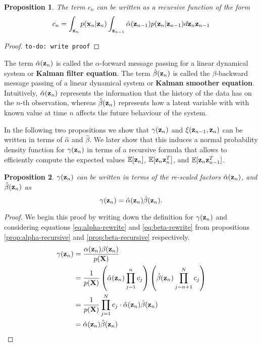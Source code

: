 \documentclass[11pt]{article}
\numberwithin{equation}{section}
\newcommand{\x}{{\bf x}}
\newcommand{\z}{{\bf z}}
\newtheorem{proposition}{Proposition}[section]
\begin{document}
\begin{proposition}
	The term $c_n$ can be written as a recursive function of the form
	\begin{equation}
		c_n = \int_{\z_n} p(\x_n \vert \z_n) \int_{\z_{n-1}} \hat\alpha(\z_{n-1})p(\z_n \vert \z_{n-1}) d\z_n\z_{n-1}
	\end{equation}
\end{proposition}

\begin{proof}
	\texttt{to-do: write proof}
\end{proof}

The term $\hat\alpha(\z_n)$ is called the $\alpha$-forward message passing for a linear dynamical system or \textbf{Kalman filter equation}.  The term $\hat\beta(\z_n)$ is called the $\beta$-backward message passing of a linear dynamical system or \textbf{Kalman smoother equation}. Intuitively, $\hat\alpha(\z_n)$ represents the information that the history of the data has on the $n$-th observation, whereas $\hat\beta(\z_n)$ represents how a latent variable with with known value at time $n$ affects the future behaviour of the system.

In the following two propositions we show that $\gamma(\z_n)$ and $\xi(\z_{n-1}, \z_{n})$ can be written in terms of $\hat\alpha$ and $\hat\beta$. We later show that this induces a normal probability density function for $\gamma(\z_n)$ in terms of a recursive formula that allows to efficiently compute the expected values $\mathbb{E}[\z_n]$, $\mathbb{E}[\z_n\z_{n}^{T}]$, and  $\mathbb{E}[\z_n\z_{n-1}^{T}]$.


\begin{proposition}\label{prop:gamma-rewrite-scaled}
	$\gamma(\z_n)$ can be written in terms of the re-scaled factors $\hat\alpha(\z_n)$, and $\hat\beta(\z_n)$ as
	\begin{equation}
		\gamma(\z_n) = \hat\alpha(\z_n)\hat\beta(\z_n).
	\end{equation}
\end{proposition}

\begin{proof} We begin this proof by writing down the definition for $\gamma(\z_n)$ and considering equations \eqref{eq:alpha-rewrite} and \eqref{eq:beta-rewrite} from propositions \ref{prop:alpha-recursive} and \ref{prop:beta-recursive} respectively.
	\begin{align}
		\gamma(\z_n) &= \frac{\alpha(\z_n) \beta(\z_n)}{p({\bf X})} \\
		&= \frac{1}{p({\bf X})}\left(\hat\alpha(\z_n) \prod_{j=1}^n c_j\right)\left(\hat\beta(\z_n) \prod_{j={n+1}}^N c_j\right) \\
		&= \frac{1}{p(\bf X)} \prod_{j=1}^N c_j \cdot \hat\alpha(\z_n) \hat\beta(\z_n)\\
		&= \hat\alpha(\z_n) \hat\beta(\z_n)
	\end{align}
\end{proof}
\end{document}
